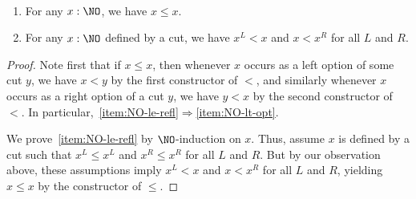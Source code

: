 %
\begin{thm}\label{thm:NO-refl-opt}\
  \begin{enumerate}
  \item For any $x:\NO$, we have $x\le x$.\label{item:NO-le-refl}
  \item For any $x:\NO$ defined by a cut, we have $x^L <x$ and $x<x^R$ for all $L$ and $R$.\label{item:NO-lt-opt}
  \end{enumerate}
\end{thm}

\begin{proof}
  Note first that if $x\le x$, then whenever $x$ occurs as a left option of some cut $y$, we have $x<y$ by the first constructor of $<$, and similarly whenever $x$ occurs as a right option of a cut $y$, we have $y<x$ by the second constructor of $<$.
  In particular,~\ref{item:NO-le-refl}$\Rightarrow$\ref{item:NO-lt-opt}.

  We prove~\ref{item:NO-le-refl} by $\NO$-induction on $x$.
  Thus, assume $x$ is defined by a cut such that $x^L\le x^L$ and $x^R \le x^R$ for all $L$ and $R$.
  But by our observation above, these assumptions imply $x^L<x$ and $x<x^R$ for all $L$ and $R$, yielding $x\le x$ by the constructor of $\le$.
\end{proof}
